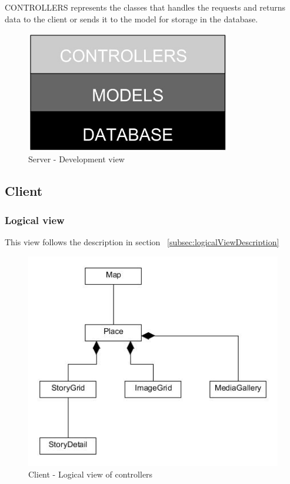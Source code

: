 \documentclass[11pt]{book}
\begin{document}
CONTROLLERS represents the classes that handles the requests and returns data to the client or sends it to the model for storage in the database.

\begin{figure}[H]
      \centering
      \includegraphics[width=0.8\textwidth]{Figures/Architecture/serverDevelopment.jpg}
      \caption{Server - Development view}
      \label{fig:arch_server_development}
\end{figure}

\subsection{Client}

\subsubsection{Logical view}
This view follows the description in section ~\ref{subsec:logicalViewDescription}

\begin{figure}[H]
      \centering
      \includegraphics[width=1.0\textwidth]{Figures/Architecture/clientLogicalController.jpg}
      \caption{Client - Logical view of controllers}
      \label{fig:arch_client_logical_controllers}
\end{figure}
\end{document}
